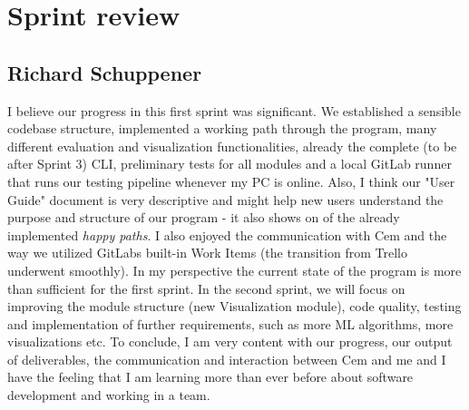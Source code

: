 \documentclass[12pt,a4paper]{article}
\begin{document}
\section{Sprint review}
\subsection{Richard Schuppener}
I believe our progress in this first sprint was significant. We established a sensible codebase structure, implemented a working path through the program, many different evaluation and visualization functionalities, already the complete (to be after Sprint 3) CLI, preliminary tests for all modules and a local GitLab runner that runs our testing pipeline whenever my PC is online.
Also, I think our "User Guide" document is very descriptive and might help new users understand the purpose and structure of our program - it also shows on of the already implemented \textit{happy paths}. I also enjoyed the communication with Cem and the way we utilized GitLabs built-in Work Items (the transition from Trello underwent smoothly).
In my perspective the current state of the program is more than sufficient for the first sprint. In the second sprint, we will focus on improving the module structure (new Visualization module), code quality, testing and implementation of further requirements, such as more ML algorithms, more visualizations etc.
To conclude, I am very content with our progress, our output of deliverables, the communication and interaction between Cem and me and I have the feeling that I am learning more than ever before about software development and working in a team.
\end{document}
